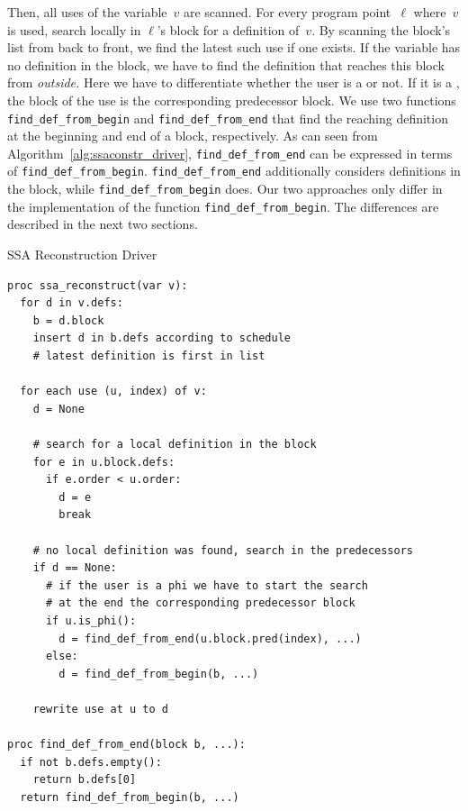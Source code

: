 Then, all uses of the variable~$v$ are scanned.
For every program point~$\ell$ where~$v$ is used, search locally in $\ell$'s block for a definition of~$v$.
By scanning the block's list from back to front, we find the latest such use if one exists. 
If the variable has no definition in the block, we have to find the definition that reaches this block from \emph{outside.}
Here we have to differentiate whether the user is a \phifun or not.
If it is a \phifun, the block of the use is the corresponding predecessor block.
We use two functions \verb|find_def_from_begin| and \verb|find_def_from_end| that find the reaching definition at the beginning and end of a block, respectively. 
As can seen from Algorithm~\ref{alg:ssaconstr_driver}, \verb|find_def_from_end| can be expressed in terms of \verb|find_def_from_begin|. 
\verb|find_def_from_end| additionally considers definitions in the block, while \verb|find_def_from_begin| does.
Our two approaches only differ in the implementation of the function \verb|find_def_from_begin|.
The differences are described in the next two sections.
\begin{algorithm}
	\caption{SSA Reconstruction Driver}
	\label{alg:ssaconstr_driver}

\begin{verbatim}
proc ssa_reconstruct(var v):
  for d in v.defs:
    b = d.block
    insert d in b.defs according to schedule
    # latest definition is first in list

  for each use (u, index) of v:
    d = None

    # search for a local definition in the block
    for e in u.block.defs:
      if e.order < u.order:
        d = e
        break
        
    # no local definition was found, search in the predecessors
    if d == None:
      # if the user is a phi we have to start the search 
      # at the end the corresponding predecessor block 
      if u.is_phi():
        d = find_def_from_end(u.block.pred(index), ...)
      else:
        d = find_def_from_begin(b, ...)

    rewrite use at u to d

proc find_def_from_end(block b, ...):
  if not b.defs.empty():
    return b.defs[0]
  return find_def_from_begin(b, ...)
\end{verbatim}
\end{algorithm}
